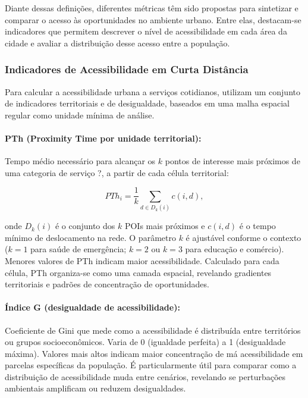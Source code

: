 Diante dessas definições, diferentes métricas têm sido propostas para sintetizar e comparar o acesso às oportunidades no ambiente urbano. Entre elas, destacam-se indicadores que permitem descrever o nível de acessibilidade em cada área da cidade e avaliar a distribuição desse acesso entre a população.

\subsubsection{Indicadores de Acessibilidade em Curta Distância}
\label{subsubsec:indicadores}

Para calcular a acessibilidade urbana a serviços cotidianos, \cite{Bruno2024} utilizam um conjunto de indicadores territoriais e de desigualdade, baseados em uma malha espacial regular como unidade mínima de análise.

\paragraph{PTh (Proximity Time por unidade territorial):} Tempo médio necessário para 
alcançar os $k$ pontos de interesse mais próximos de uma categoria de serviço ?, a partir 
de cada célula territorial:

\begin{equation}
    PTh_i = \frac{1}{k} \sum_{d \in D_k(i)} c(i,d),
\end{equation}

\noindent onde $D_k(i)$ é o conjunto dos $k$ POIs mais próximos e $c(i,d)$ é o tempo 
mínimo de deslocamento na rede. O parâmetro $k$ é ajustável conforme o contexto 
($k=1$ para saúde de emergência; $k=2$ ou $k=3$ para educação e comércio). Menores 
valores de PTh indicam maior acessibilidade. Calculado para cada célula, PTh organiza-se 
como uma camada espacial, revelando gradientes territoriais e padrões de concentração 
de oportunidades.

\paragraph{Índice G (desigualdade de acessibilidade):} Coeficiente de Gini que mede 
como a acessibilidade é distribuída entre territórios ou grupos socioeconômicos. 
Varia de 0 (igualdade perfeita) a 1 (desigualdade máxima). Valores mais altos indicam 
maior concentração de má acessibilidade em parcelas específicas da população. É 
particularmente útil para comparar como a distribuição de acessibilidade muda entre 
cenários, revelando se perturbações ambientais amplificam ou reduzem desigualdades.

